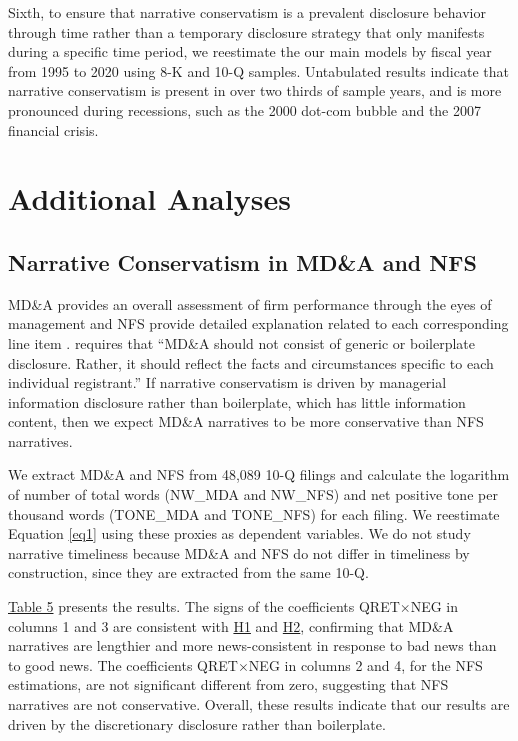\documentclass[letterpaper,12pt]{article}
\begin{document}
\begin{spacing}{1.5}
Sixth, to ensure that narrative conservatism is a prevalent disclosure behavior through time rather than a temporary disclosure strategy that only manifests during a specific time period, we reestimate the our main models by fiscal year from 1995 to 2020 using 8-K and 10-Q samples. Untabulated results indicate that narrative conservatism is present in over two thirds of sample years, and is more pronounced during recessions, such as the 2000 dot-com bubble and the 2007 financial crisis.

\section{Additional Analyses}
\subsection{Narrative Conservatism in MD\&A and NFS}
\noindent MD\&A provides an overall assessment of firm performance through the eyes of management and NFS provide detailed explanation related to each corresponding line item \cite{fasbConceptualFrameworkFinancial2018a, secFinancialReportingManual2019}.  requires that ``MD\&A should not consist of generic or boilerplate disclosure. Rather, it should reflect the facts and circumstances specific to each individual registrant.'' If narrative conservatism is driven by managerial information disclosure rather than boilerplate, which has little information content, then we expect MD\&A narratives to be more conservative than NFS narratives.

We extract MD\&A and NFS from 48,089 10-Q filings and calculate the logarithm of number of total words (NW\_MDA and NW\_NFS) and net positive tone per thousand words (TONE\_MDA and TONE\_NFS) for each filing. We reestimate Equation \eqref{eq1} using these proxies as dependent variables. We do not study narrative timeliness because MD\&A and NFS do not differ in timeliness by construction, since they are extracted from the same 10-Q.

\hyperref[T5]{Table 5} presents the results. The signs of the coefficients QRET$\times$NEG in columns 1 and 3 are consistent with \hyperref[h1]{H1} and \hyperref[h2]{H2}, confirming that MD\&A narratives are lengthier and more news-consistent in response to bad news than to good news. The coefficients QRET$\times$NEG in columns 2 and 4, for the NFS estimations, are not significant different from zero, suggesting that NFS narratives are not conservative. Overall, these results indicate that our results are driven by the discretionary disclosure rather than boilerplate.


\end{spacing}
\end{document}
